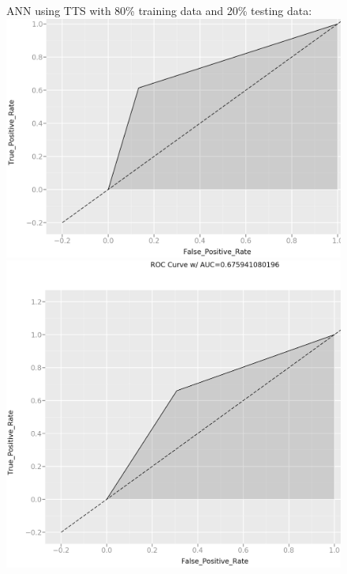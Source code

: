 \documentclass[11pt]{article}
\begin{document}
\begin{figure}[h]
\centering
ANN using TTS with 80\% training data and 20\% testing data:
\includegraphics[scale = .30]{ann1}
\includegraphics[scale = .25]{ann2}
\end{figure}

\newpage
\end{document}
